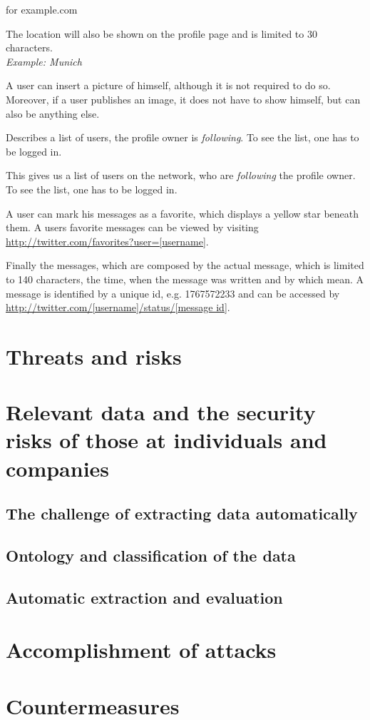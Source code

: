 \begin{description}
{                    for example.com}
\item[Location] The location will also be shown on the profile page and is
                limited to 30 characters.\\
                \textit{Example: Munich}
\item[Picture] A user can insert a picture of himself, although it is not
               required to do so. Moreover, if a user publishes an image, it does not have to
               show himself, but can also be anything else.
\item[Following] Describes a list of users, the profile owner is \textit{following}.
                 To see the list, one has to be logged in.
\item[Followers] This gives us a list of users on the \Twitter{} network, who
                 are \textit{following} the profile owner. To see the list, one has to be logged in.
\item[Favorites] A user can mark his messages as a favorite, which displays a
                 yellow star beneath them. A users favorite messages can be viewed
                 by visiting \url{http://twitter.com/favorites?user=[username]}.
\item[Messages] Finally the messages, which are composed by the actual message,
                which is limited to 140 characters, the time, when the message
                was written and by which mean. A message is identified by a unique
                id, e.g. 1767572233 and can be accessed by
                \url{http://twitter.com/[username]/status/[message id]}.
\end{description}


\section{Threats and risks}

\section{Relevant data and the security risks of those at individuals and companies}
\subsection{The challenge of extracting data automatically}
\subsection{Ontology and classification of the data}
\subsection{Automatic extraction and evaluation}

\section{Accomplishment of attacks}

\section{Countermeasures}
